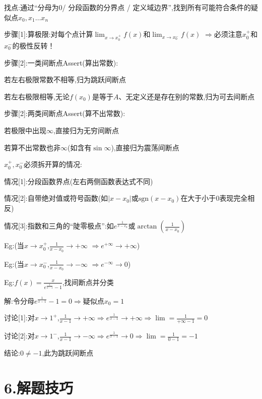\documentclass[11pt,a4paper,UTF8]{ctexart}
\begin{document}
\begin{thmbox}

找点:通过“分母为$0$/ 分段函数的分界点 / 定义域边界”,找到所有可能符合条件的疑似点$x_0, x_1 \dots x_n$

步骤[1]:算极限:对每个点计算$\lim_{x \to x_0^+} f(x)$和$\lim_{x \to x_0^-} f(x)$ $\Rightarrow$必须注意$x_0^+$和$x_0^-$的极性反转！

步骤[2]:一类间断点Assert(算出常数):

  若左右极限常数不相等,归为跳跃间断点

  若左右极限相等,无论$f(x_0)$是等于$A$、无定义还是存在别的常数,归为可去间断点

步骤[2]:两类间断点Assert(算不出常数):

  若极限中出现$\infty$,直接归为无穷间断点

  若算不出常数也非$\infty$(如含有$\sin \infty$),直接归为震荡间断点

\textit{}$x_0^+, x_0^-$必须拆开算的情况:\textit{}

情况[1]:分段函数界点(左右两侧函数表达式不同)

情况[2]:自带绝对值或符号函数(如$|x-x_0|$或$\text{sgn}(x-x_0)$在大于小于$0$表现完全相反)

情况[3]:指数和三角的“陡零极点”:如$e^{\frac{1}{x-x_0}}$或$\arctan(\frac{1}{x-x_0})$

  Eg:(当$x \to x_0^+$,$\frac{1}{x-x_0} \to +\infty$ $\Rightarrow e^{+\infty} \to +\infty$)

  Eg:(当$x \to x_0^-$,$\frac{1}{x-x_0} \to -\infty$ $\Rightarrow e^{-\infty} \to 0$)

Eg:$f(x) = \frac{x}{e^{\frac{1}{x-1}} - 1}$,找间断点并分类

  解:令分母$e^{\frac{1}{x-1}} - 1 = 0 \Rightarrow$疑似点$x_0 = 1$

  讨论[1]:对$x \to 1^+$,$\frac{1}{x-1} \to +\infty \Rightarrow e^{\frac{1}{x-1}} \to +\infty \Rightarrow \lim = \frac{1}{+\infty - 1} = 0$

  讨论[2]:对$x \to 1^-$,$\frac{1}{x-1} \to -\infty \Rightarrow e^{\frac{1}{x-1}} \to 0 \Rightarrow \lim = \frac{1}{0 - 1} = -1$

  结论:$0 \neq -1$,此为跳跃间断点

\end{thmbox}

\section{6.解题技巧}
\end{document}
